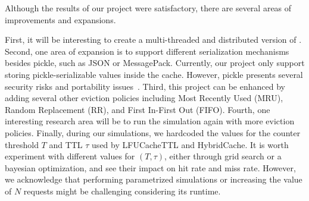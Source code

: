 Although the results of our project were satisfactory,
there are several areas of improvements and expansions.

First, it will be interesting to create a multi-threaded and
distributed version of \sqlitecache.
Second, one area of expansion is to support different
serialization mechanisms besides pickle, such as JSON or
MessagePack.
Currently, our project only support storing pickle-serializable
values inside the cache. However, pickle presents
several security risks and portability issues~\cite{arjancodesPickle}.
Third, this project can be enhanced by adding
several other eviction policies including
Most Recently Used (MRU), Random Replacement (RR),
and First In-First Out (FIFO). Fourth,
one interesting research area will be to run
the simulation again with more eviction policies.
Finally, during our simulations, we hardcoded
the values for the counter threshold $T$ and TTL $\tau$
used by LFUCacheTTL and HybridCache. It is worth
experiment with different values for $(T, \tau)$,
either through grid search or a bayesian optimization,
and see their impact on hit rate and miss rate.
However, we acknowledge that performing parametrized
simulations or increasing the value of $N$ requests
might be challenging considering its runtime.